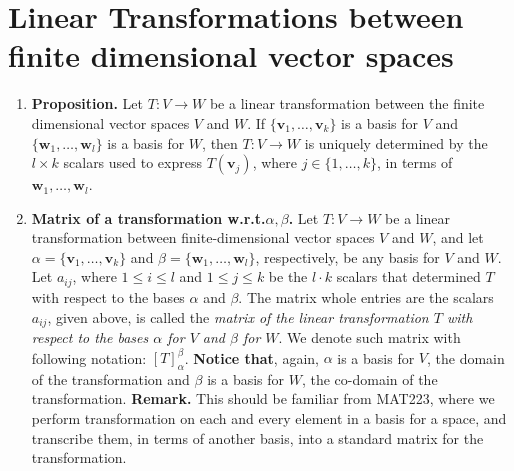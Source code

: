 \documentclass[oneside, 12pt]{book}
\newcommand{\settag}[1]{\renewcommand{\theenumi}{#1}}
\newcommand{\tbf}[1]{\textbf{#1}}
\newcommand{\tit}[1]{\textit{#1}}
\begin{document}
\section{Linear Transformations between finite dimensional vector spaces}
    \begin{enumerate}
        \settag{2.2.1}
        \item \tbf{Proposition.} Let $T:V\xrightarrow{}W$ be a linear transformation between the finite dimensional vector spaces $V$ and $W$. If $\{\mathbf{v}_1,\ldots,\mathbf{v}_k\}$ is a basis for $V$ and $\{\mathbf{w}_1,\ldots,\mathbf{w}_l\}$ is a basis for $W$, then $T:V\xrightarrow{}W$ is uniquely determined by the $l\times k$ scalars used to express $T(\mathbf{v}_j)$, where $j\in \{1,\ldots,k\}$, in terms of $\mathbf{w}_1,\ldots,\mathbf{w}_l$.
        
        \settag{2.2.6}
        \item \tbf{Matrix of a transformation w.r.t.$\alpha,\beta$.} Let $T:V\xrightarrow{}W$ be a linear transformation between finite-dimensional vector spaces $V$ and $W$, and let $\alpha = \{\mathbf{v}_1,\ldots,\mathbf{v}_k \}$ and $\beta = \{\mathbf{w}_1,\ldots,\mathbf{w}_l\}$, respectively, be any basis for $V$ and $W$. 
        Let $a_{ij}$, where $1\leq i \leq l$ and $1\leq j \leq k$ be the $l\cdot k$ scalars that determined $T$ with respect to the bases $\alpha$ and $\beta$. The matrix whole entries are the scalars $a_{ij}$, given above, is called the \tit{matrix of the linear transformation $T$ with respect to the bases $\alpha$ for $V$ and $\beta$ for $W$}. We denote such matrix with following notation: $\left[T\right]^\beta_\alpha$. \newline 
        \tbf{Notice that}, again, $\alpha$ is a basis for $V$, the domain of the transformation and $\beta$ is a basis for $W$, the co-domain of the transformation.
        \newline
        \tbf{Remark.} This should be familiar from MAT223, where we perform transformation on each and every element in a basis for a space, and transcribe them, in terms of another basis, into a standard matrix for the transformation.
        

\end{enumerate}
\end{document}
